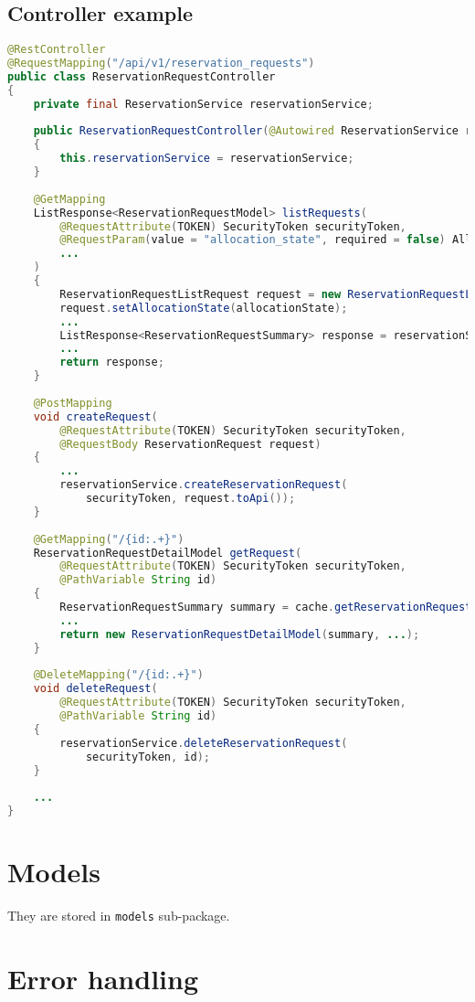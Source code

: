 \subsection{Controller example}
\begin{lstlisting}[language=java, caption=ReservationRequestController.java, label=lst:controller]
@RestController
@RequestMapping("/api/v1/reservation_requests")
public class ReservationRequestController
{
    private final ReservationService reservationService;
    
    public ReservationRequestController(@Autowired ReservationService reservationService)
    {
        this.reservationService = reservationService;
    }
    
    @GetMapping
    ListResponse<ReservationRequestModel> listRequests(
        @RequestAttribute(TOKEN) SecurityToken securityToken,
        @RequestParam(value = "allocation_state", required = false) AllocationState allocationState,
        ...
    )
    {
        ReservationRequestListRequest request = new ReservationRequestListRequest();
        request.setAllocationState(allocationState);
        ...
        ListResponse<ReservationRequestSummary> response = reservationService.listReservationRequests(request);
        ...
        return response;
    }
    
    @PostMapping
    void createRequest(
        @RequestAttribute(TOKEN) SecurityToken securityToken,
        @RequestBody ReservationRequest request)
    {
        ...
        reservationService.createReservationRequest(
            securityToken, request.toApi());
    }
    
    @GetMapping("/{id:.+}")
    ReservationRequestDetailModel getRequest(
        @RequestAttribute(TOKEN) SecurityToken securityToken,
        @PathVariable String id)
    {
        ReservationRequestSummary summary = cache.getReservationRequestSummary(securityToken, id);
        ...
        return new ReservationRequestDetailModel(summary, ...);
    }
    
    @DeleteMapping("/{id:.+}")
    void deleteRequest(
        @RequestAttribute(TOKEN) SecurityToken securityToken,
        @PathVariable String id)
    {
        reservationService.deleteReservationRequest(
            securityToken, id);
    }
    
    ...
}
\end{lstlisting}


\section{Models}
They are stored in \texttt{models} sub-package.

\section{Error handling}
